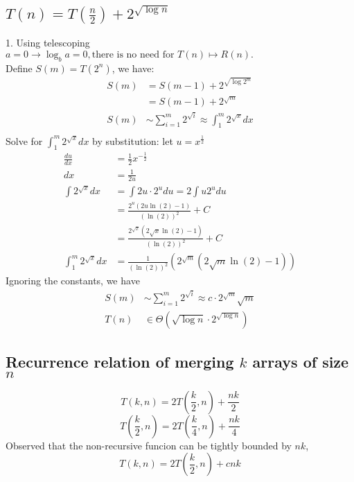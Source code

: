 \documentclass{article}
\begin{document}
\subsection*{$T(n) = T(\frac{n}{2}) + 2^{\sqrt{\log n}}$}
1. Using telescoping\\
$a = 0 \rightarrow \log_b a = 0, \text{there is no need for }T(n) \mapsto R(n).$\\
Define $S(m) = T(2^n)$, we have:\\
\begin{align*}
    S(m) &= S(m - 1) + 2^{\sqrt{\log{2^m}}}\\
    &= S(m - 1) + 2^{\sqrt{m}}    \\
    S(m) &\sim \sum_{i=1}^{m} 2^{\sqrt{i}} \approx \int_{1}^{m} 2^{\sqrt{x}} dx\\
\end{align*}
Solve for $ \int_{1}^{m} 2^{\sqrt{x}} dx$ by substitution: let $u = x^\frac{1}{2}$
\begin{align*}
    \frac{du}{dx} &= \frac{1}{2}x^{-\frac{1}{2}}\\
    dx &= \frac{1}{2u}\\
    \int 2^{\sqrt{x}} dx &= \int 2u\cdot 2^u du = 2\int u2^udu\\
    &= \frac{2^u(2u \ln(2) - 1)}{(\ln(2))^2} + C\\
    &= \frac{2^{\sqrt{x}}(2\sqrt{x} \ln(2) - 1)}{(\ln(2))^2} + C\\
    \int_{1}^{m} 2^{\sqrt{x}} dx &= \frac{1}{(\ln(2))^2}\left(2^{\sqrt{m}}(2\sqrt{m} \ln(2)-1)\right)
\end{align*}
Ignoring the constants, we have 
\begin{align*}
    S(m) &\sim \sum_{i=1}^{m} 2^{\sqrt{i}} \approx c\cdot 2^{\sqrt{m}}\sqrt{m}\\
    T(n) &\in \Theta(\sqrt{\log n}\cdot 2^{\sqrt{\log n}})
\end{align*}
\subsection*{Recurrence relation of merging $k$ arrays of size $n$}
\[T(k, n) = 2T(\frac{k}{2}, n) + \frac{nk}{2}\]
\[T(\frac{k}{2}, n) = 2T(\frac{k}{4}, n) + \frac{nk}{4}\]
Observed that the non-recursive funcion can be tightly bounded by $nk$,
\[T(k, n) = 2T(\frac{k}{2}, n) + cnk\]
\end{document}
